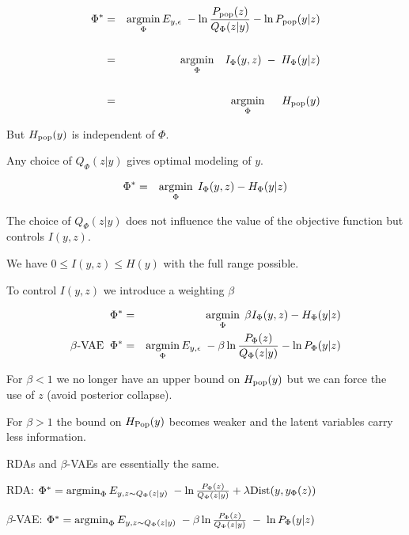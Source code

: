 {

\begin{eqnarray*}
\Phi^* & = & \operatorname*{argmin}_\Phi E_{y,\epsilon}\;-\ln \frac{P_{\mathrm{pop}}(z)}{Q_\Phi(z|y)} - \ln P_{\mathrm{pop}}(y|z) \\
\\
& = & \operatorname*{argmin}_\Phi \;\;\;I_\Phi(y,z)\; - \; H_\Phi(y|z) \\
\\
& = & \operatorname*{argmin}_\Phi \;\;\;\;\; H_{\mathrm{pop}}(y)
\end{eqnarray*}

\vfill
But $H_{\mathrm{pop}}(y)$ is independent of $\Phi$.

\vfill
Any choice of $Q_\Phi(z|y)$ gives optimal modeling of $y$.


\begin{eqnarray*}
\Phi^* & = & \operatorname*{argmin}_\Phi \; I_\Phi(y,z) - H_\Phi(y|z)
\end{eqnarray*}

\vfill
The choice of $Q_\Phi(z|y)$ does not influence the value of the objective function but controls $I(y,z)$.

\vfill
We have $0 \leq I(y,z) \leq H(y)$ with the full range possible.


To control $I(y,z)$ we introduce a weighting $\beta$

\begin{eqnarray*}
\Phi^* & = & \operatorname*{argmin}_\Phi \; \beta I_\Phi(y,z) - H_\Phi(y|z) \\
\mbox{$\beta$-VAE}\;\; \Phi^* & = & \operatorname*{argmin}_\Phi E_{y,\epsilon}\;-\beta \ln \frac{P_\Phi(z)}{Q_\Phi(z|y)} - \ln P_\Phi(y|z)
\end{eqnarray*}

\vfill
For $\beta < 1$ we no longer have an upper bound on $H_{\mathrm{pop}}(y)$ but we can force the use of $z$ (avoid posterior collapse).

\vfill
For $\beta > 1$ the bound on $H_{\mathrm{Pop}}(y)$ becomes weaker and the latent variables carry less information.


RDAs and $\beta$-VAEs are essentially the same.

\vfill
RDA: $\Phi^* = \operatorname*{argmin}_\Phi E_{y,z \sim Q_\Phi(z|y)}\;-\ln \frac{P_\Phi(z)}{Q_\Phi(z|y)} + \lambda \mathrm{Dist}(y,y_\Phi(z))$

\vfill
$\beta$-VAE: $\Phi^* = \operatorname*{argmin}_\Phi E_{y,z \sim Q_\Phi(z|y)}\;-\beta \ln \frac{P_\Phi(z)}{Q_\Phi(z|y)} \;-\;\ln P_\Phi(y|z)$

}
